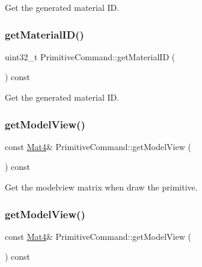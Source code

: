 Get the generated material ID. \mbox{\label{classPrimitiveCommand_a524b9922884e50c3512a5064ecf1514d}} 
\subsubsection{\texorpdfstring{get\+Material\+I\+D()}{getMaterialID()}\hspace{0.1cm}{\footnotesize\ttfamily [2/2]}}
{\footnotesize\ttfamily uint32\+\_\+t Primitive\+Command\+::get\+Material\+ID (\begin{DoxyParamCaption}{ }\end{DoxyParamCaption}) const\hspace{0.3cm}{\ttfamily [inline]}}

Get the generated material ID. \mbox{\label{classPrimitiveCommand_a3625a2289ce8069914ce790b7ac7d29a}} 
\subsubsection{\texorpdfstring{get\+Model\+View()}{getModelView()}\hspace{0.1cm}{\footnotesize\ttfamily [1/2]}}
{\footnotesize\ttfamily const \hyperlink{classMat4}{Mat4}\& Primitive\+Command\+::get\+Model\+View (\begin{DoxyParamCaption}{ }\end{DoxyParamCaption}) const\hspace{0.3cm}{\ttfamily [inline]}}

Get the modelview matrix when draw the primitive. \mbox{\label{classPrimitiveCommand_a3625a2289ce8069914ce790b7ac7d29a}} 
\subsubsection{\texorpdfstring{get\+Model\+View()}{getModelView()}\hspace{0.1cm}{\footnotesize\ttfamily [2/2]}}
{\footnotesize\ttfamily const \hyperlink{classMat4}{Mat4}\& Primitive\+Command\+::get\+Model\+View (\begin{DoxyParamCaption}{ }\end{DoxyParamCaption}) const\hspace{0.3cm}{\ttfamily [inline]}}

